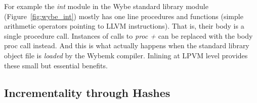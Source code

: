For example the \textit{int} module in the Wybe standard library module
(Figure~\ref{fig:wybe_int}) mostly has one line procedures and functions
(simple arithmetic operators pointing to LLVM instructions). That is, their
body is a single procedure call. Instances of calls to \textit{proc +} can be
replaced with the body proc call instead. And this is what actually happens
when the standard library object file is \textit{loaded} by the Wybemk
compiler. Inlining at LPVM level provides these small but essential benefits.


\subsection{Incrementality through Hashes}




